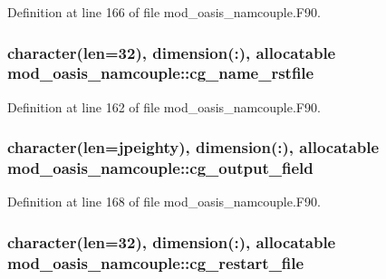 Definition at line 166 of file mod\+\_\+oasis\+\_\+namcouple.\+F90.

\hypertarget{classmod__oasis__namcouple_ac79429a9522aabddbe4ed68fd9571bec}{
\subsubsection[{cg\+\_\+name\+\_\+rstfile}]{\setlength{\rightskip}{0pt plus 5cm}character(len=32), dimension(\+:), allocatable mod\+\_\+oasis\+\_\+namcouple\+::cg\+\_\+name\+\_\+rstfile\hspace{0.3cm}{\ttfamily [private]}}}\label{classmod__oasis__namcouple_ac79429a9522aabddbe4ed68fd9571bec}


Definition at line 162 of file mod\+\_\+oasis\+\_\+namcouple.\+F90.

\hypertarget{classmod__oasis__namcouple_a1b680bf476776f3db085dc1f0009736c}{
\subsubsection[{cg\+\_\+output\+\_\+field}]{\setlength{\rightskip}{0pt plus 5cm}character(len={\bf jpeighty}), dimension(\+:), allocatable mod\+\_\+oasis\+\_\+namcouple\+::cg\+\_\+output\+\_\+field\hspace{0.3cm}{\ttfamily [private]}}}\label{classmod__oasis__namcouple_a1b680bf476776f3db085dc1f0009736c}


Definition at line 168 of file mod\+\_\+oasis\+\_\+namcouple.\+F90.

\hypertarget{classmod__oasis__namcouple_a6eec7fe795bfb9c2058c7953c072d442}{
\subsubsection[{cg\+\_\+restart\+\_\+file}]{\setlength{\rightskip}{0pt plus 5cm}character(len=32), dimension(\+:), allocatable mod\+\_\+oasis\+\_\+namcouple\+::cg\+\_\+restart\+\_\+file\hspace{0.3cm}{\ttfamily [private]}}}\label{classmod__oasis__namcouple_a6eec7fe795bfb9c2058c7953c072d442}


